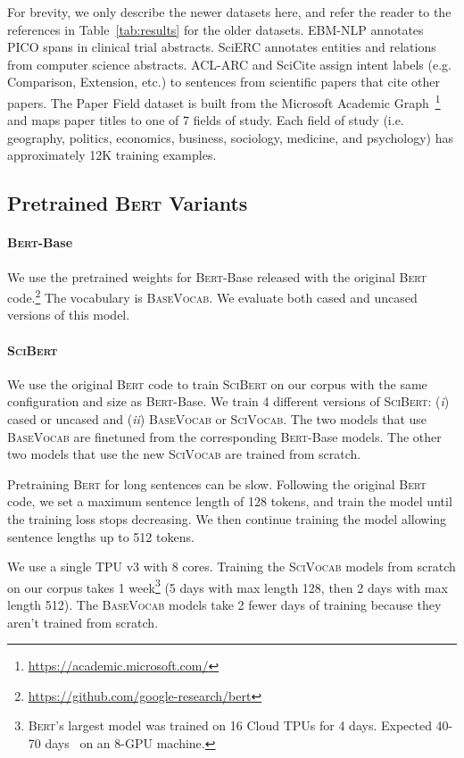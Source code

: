 \documentclass[11pt,a4paper]{article}
\newcommand{\bert}{\textsc{Bert}\xspace}
\newcommand{\scibert}{\textsc{SciBert}\xspace}
\newcommand{\basevocab}{\textsc{BaseVocab}\xspace}
\newcommand{\scivocab}{\textsc{SciVocab}\xspace}
\begin{document}
For brevity, we only describe the newer datasets here, and refer the reader to the references in Table~\ref{tab:results} for the older datasets. 
EBM-NLP \cite{Nye2018ACW} annotates PICO spans in clinical trial abstracts. 
SciERC \cite{Luan2018MultiTaskIO} annotates entities and relations from computer science abstracts.  
ACL-ARC \cite{Jurgens2018MeasuringTE} and SciCite \cite{naacl2019-scicite} assign intent labels (e.g. Comparison, Extension, etc.) to sentences from scientific papers that cite other papers.  
The Paper Field dataset is built from the Microsoft Academic Graph~\cite{Sinha2015AnOO}\footnote{\url{https://academic.microsoft.com/}} and maps paper titles to one of 7 fields of study.
Each field of study (i.e. geography, politics, economics, business, sociology, medicine, and psychology) has approximately 12K training examples.

\subsection{Pretrained \bert Variants}


\paragraph{\bert-Base} We use the pretrained weights for \bert-Base \cite{Devlin2018BERTPO} released with the original \bert code.\footnote{\url{https://github.com/google-research/bert}} The vocabulary is \basevocab. We evaluate both cased and uncased versions of this model.




\paragraph{\scibert}
We use the original \bert code
to train \scibert on our corpus with the same configuration and size as \bert-Base. 
We train 4 different versions of \scibert:
(\textit{i}) cased or uncased and (\textit{ii}) \basevocab or \scivocab. 
The two models that use \basevocab are finetuned from the corresponding \bert-Base models. 
The other two models that use the new \scivocab are 
trained from scratch.

Pretraining \bert for long sentences can be slow.  Following the original \bert code, we set a maximum sentence length of 128 tokens, and train the model until the training loss stops decreasing. We then continue training the model allowing sentence lengths up to 512 tokens. 

We use a single TPU v3 with 8 cores.  Training the \scivocab models from scratch on our corpus takes 1 week\footnote{\bert's largest model was trained on 16 Cloud TPUs for 4 days. Expected 40-70 days~\cite{timdettmers} on an 8-GPU machine.} (5 days with max length 128, then 2 days with max length 512). 
The \basevocab models take 2 fewer days of training because they aren't trained from scratch.
\end{document}
